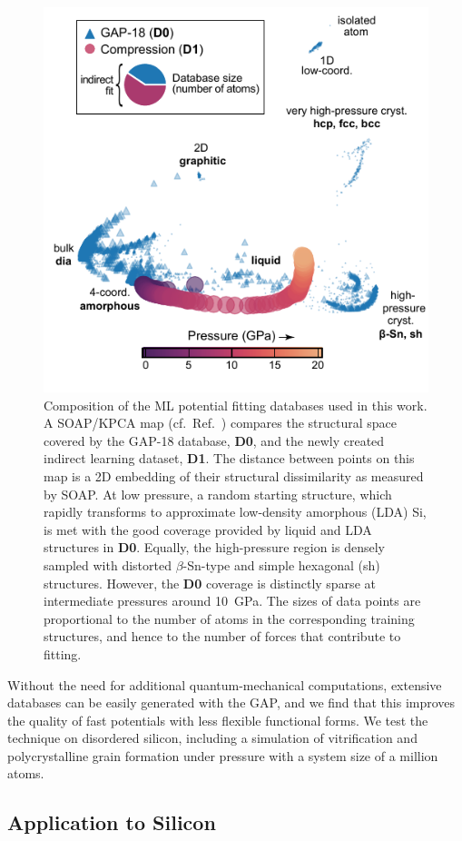 \documentclass[12pt,a4paper,twoside,nobind]{ociamthesis}
\begin{document}
\begin{figure}[ht]
  \includegraphics[width=0.6\linewidth]{soap_map.pdf}
  \centering
  \caption{
    Composition of the ML potential fitting databases used in this work.
    A SOAP/KPCA map (cf.\ Ref.\ \cite{Cheng2020}) compares the structural space covered by the GAP-18 database,\autocite{Bartok2018} \textbf{D0}, 
    and the newly created indirect learning dataset, \textbf{D1}. 
    The distance between points on this map is a 2D embedding of their structural dissimilarity as measured by SOAP.\autocite{Bartok2013} 
    At low pressure, a random starting structure, which rapidly transforms to approximate low-density amorphous (LDA) Si, 
    is met with the good coverage provided by liquid and LDA structures in \textbf{D0}. 
    Equally, the high-pressure region is densely sampled with distorted $\beta$-Sn-type and simple hexagonal (sh) structures. 
    However, the \textbf{D0} coverage is distinctly sparse at intermediate pressures around \SI{10}{GPa}.
    The sizes of data points are proportional to the number of atoms in the corresponding training structures, and hence to the number of forces that contribute to fitting.
  }
  \label{fig:soap_map}
\end{figure}

Without the need for additional quantum-mechanical computations, extensive databases can be easily generated with the GAP,
and we find that this improves the quality of fast potentials with less flexible functional forms.
We test the technique on disordered silicon, 
including a simulation of vitrification and polycrystalline grain formation under pressure with a system size of a million atoms.



\subsection{Application to Silicon}
\end{document}
